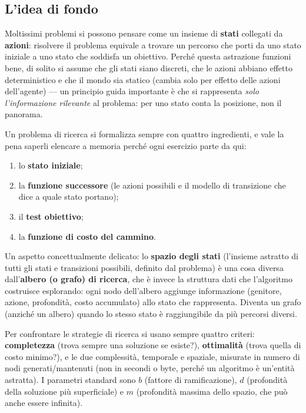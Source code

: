 \documentclass[11pt,a4paper]{article}
\begin{document}
\subsection{L'idea di fondo}

Moltissimi problemi si possono pensare come un insieme di \textbf{stati} collegati da \textbf{azioni}: risolvere il problema equivale a trovare un percorso che porti da uno stato iniziale a uno stato che soddisfa un obiettivo. Perché questa astrazione funzioni bene, di solito si assume che gli stati siano discreti, che le azioni abbiano effetto deterministico e che il mondo sia statico (cambia solo per effetto delle azioni dell'agente) --- un principio guida importante è che si rappresenta \emph{solo l'informazione rilevante} al problema: per uno stato conta la posizione, non il panorama.

Un problema di ricerca si formalizza sempre con quattro ingredienti, e vale la pena saperli elencare a memoria perché ogni esercizio parte da qui:

\begin{enumerate}
  \item lo \textbf{stato iniziale};
  \item la \textbf{funzione successore} (le azioni possibili e il modello di transizione che dice a quale stato portano);
  \item il \textbf{test obiettivo};
  \item la \textbf{funzione di costo del cammino}.
\end{enumerate}

Un aspetto concettualmente delicato: lo \textbf{spazio degli stati} (l'insieme astratto di tutti gli stati e transizioni possibili, definito dal problema) è una cosa diversa dall'\textbf{albero (o grafo) di ricerca}, che è invece la struttura dati che l'algoritmo costruisce esplorando: ogni nodo dell'albero aggiunge informazione (genitore, azione, profondità, costo accumulato) allo stato che rappresenta. Diventa un grafo (anziché un albero) quando lo stesso stato è raggiungibile da più percorsi diversi.

Per confrontare le strategie di ricerca si usano sempre quattro criteri: \textbf{completezza} (trova sempre una soluzione se esiste?), \textbf{ottimalità} (trova quella di costo minimo?), e le due complessità, temporale e spaziale, misurate in numero di nodi generati/mantenuti (non in secondi o byte, perché un algoritmo è un'entità astratta). I parametri standard sono $b$ (fattore di ramificazione), $d$ (profondità della soluzione più superficiale) e $m$ (profondità massima dello spazio, che può anche essere infinita).
\end{document}

